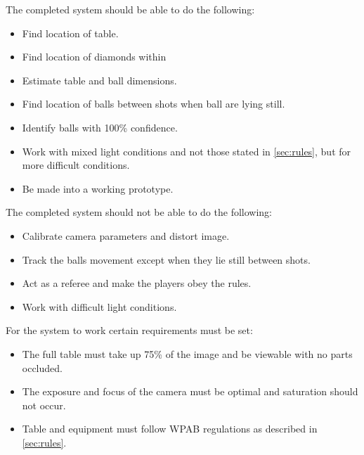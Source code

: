 The completed system should be able to do the following:

\begin{itemize}
	\item Find location of table.
	\item Find location of diamonds within  
	\item Estimate table and ball dimensions.

	\item Find location of balls between shots when ball are lying still.
	\item Identify balls with 100\% confidence. %
	
	\item Work with mixed light conditions and not those stated in \ref{sec:rules}, but for more difficult conditions.
	
	\item Be made into a working prototype.
	
\end{itemize}

The completed system should not be able to do the following:

\begin{itemize}
	\item Calibrate camera parameters and distort image.
	\item Track the balls movement except when they lie still between shots.
	\item Act as a referee and make the players obey the rules.
	\item Work with difficult light conditions.
\end{itemize}
For the system to work certain requirements must be set:

\begin{itemize}
	\item The full table must take up 75\% of the image and  be viewable with no parts occluded.
	\item The exposure and focus of the camera must be optimal and saturation should not occur.
	\item Table and equipment must follow WPAB regulations as described in \ref{sec:rules}.
\end{itemize}